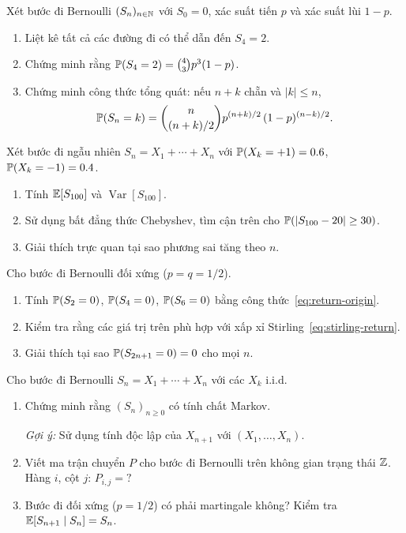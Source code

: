 \begin{exercise}
\label{ex:dist-S4}
Xét bước đi Bernoulli $(S_n)_{n \in \mathbb{N}}$ với $S_0 = 0$, xác suất tiến $p$ và xác suất lùi $1-p$.
\begin{enumerate}[nosep]
  \item Liệt kê tất cả các đường đi có thể dẫn đến $S_4 = 2$.
  \item Chứng minh rằng $\mathbb{P}(S_4 = 2) = \binom{4}{3}p^3(1-p)$.
  \item Chứng minh công thức tổng quát: nếu $n+k$ chẵn và $|k| \leq n$,
    \[
      \mathbb{P}(S_n = k) = \binom{n}{(n+k)/2} p^{(n+k)/2}\,(1-p)^{(n-k)/2}.
    \]
\end{enumerate}
\end{exercise}

\begin{exercise}
\label{ex:mean-var-calc}
Xét bước đi ngẫu nhiên $S_n = X_1 + \cdots + X_n$ với $\mathbb{P}(X_k = +1) = 0.6$, $\mathbb{P}(X_k = -1) = 0.4$.
\begin{enumerate}[nosep]
  \item Tính $\mathbb{E}[S_{100}]$ và $\operatorname{Var}[S_{100}]$.
  \item Sử dụng bất đẳng thức Chebyshev, tìm cận trên cho $\mathbb{P}(|S_{100} - 20| \geq 30)$.
  \item Giải thích trực quan tại sao phương sai tăng theo $n$.
\end{enumerate}
\end{exercise}

\begin{exercise}
\label{ex:return-to-zero}
Cho bước đi Bernoulli đối xứng ($p = q = 1/2$).
\begin{enumerate}[nosep]
  \item Tính $\mathbb{P}(S_2 = 0)$, $\mathbb{P}(S_4 = 0)$, $\mathbb{P}(S_6 = 0)$ bằng công thức~\eqref{eq:return-origin}.
  \item Kiểm tra rằng các giá trị trên phù hợp với xấp xỉ Stirling~\eqref{eq:stirling-return}.
  \item Giải thích tại sao $\mathbb{P}(S_{2n+1} = 0) = 0$ cho mọi $n$.
\end{enumerate}
\end{exercise}

\begin{exercise}
\label{ex:rw-markov}
Cho bước đi Bernoulli $S_n = X_1 + \cdots + X_n$ với các $X_k$ i.i.d.
\begin{enumerate}[nosep]
  \item Chứng minh rằng $(S_n)_{n \geq 0}$ có tính chất Markov.

    \emph{Gợi ý:} Sử dụng tính độc lập của $X_{n+1}$ với $(X_1, \ldots, X_n)$.
  \item Viết ma trận chuyển $P$ cho bước đi Bernoulli trên không gian trạng thái $\mathbb{Z}$.
    Hàng $i$, cột $j$: $P_{i,j} = ?$
  \item Bước đi đối xứng ($p = 1/2$) có phải martingale không? Kiểm tra $\mathbb{E}[S_{n+1} \mid S_n] = S_n$.
\end{enumerate}
\end{exercise}
